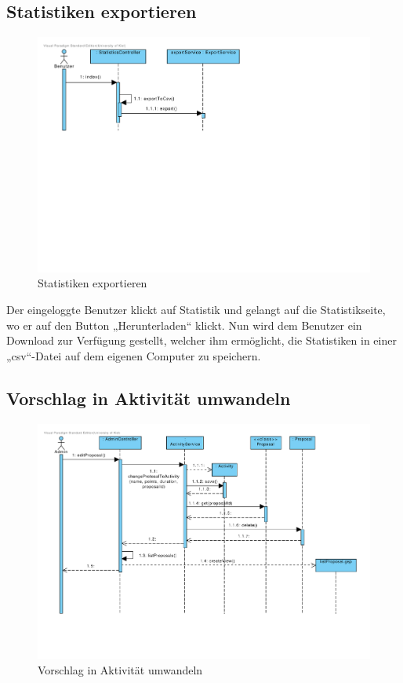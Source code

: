\subsection{Statistiken exportieren}

\begin{figure}[H]
  \centering
  \includegraphics[width=\textwidth, trim=1cm 11cm 11cm 1cm, clip]{gfx/statistiken_exportieren}
  \caption{Statistiken exportieren}
\end{figure}

Der eingeloggte Benutzer klickt auf Statistik und gelangt auf die
Statistikseite, wo er auf den Button „Herunterladen“ klickt. Nun wird
dem Benutzer ein Download zur Verfügung gestellt, welcher ihm
ermöglicht, die Statistiken in einer „csv“-Datei auf dem eigenen
Computer zu speichern.

\subsection{Vorschlag in Aktivität umwandeln}

\begin{figure}[H]
  \centering
  \includegraphics[width=\textwidth, clip]{gfx/vorschlag_in_aktivitaet_umwandeln}
  \caption{Vorschlag in Aktivität umwandeln}
\end{figure}


